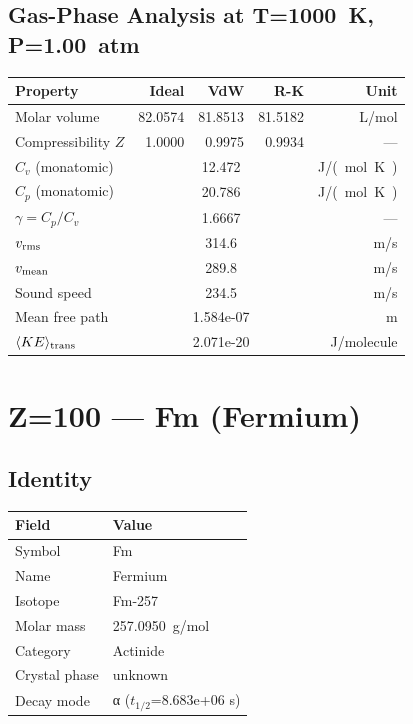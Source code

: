 \documentclass[11pt,a4paper]{article}
\begin{document}
\subsection{Gas-Phase Analysis at T=\SI{1000}{K}, P=\SI{1.00}{atm}}
\begin{tabular}{lrrrr}
  \toprule
  Property & Ideal & VdW & R-K & Unit \\
  \midrule
  Molar volume & 82.0574 & 81.8513 & 81.5182 & \si{L/mol} \\
  Compressibility $Z$ & 1.0000 & 0.9975 & 0.9934 & --- \\
  \midrule
  $C_v$ (monatomic) & \multicolumn{3}{c}{12.472} & \si{J/(mol.K)} \\
  $C_p$ (monatomic) & \multicolumn{3}{c}{20.786} & \si{J/(mol.K)} \\
  $\gamma = C_p/C_v$ & \multicolumn{3}{c}{1.6667} & --- \\
  $v_{\rm rms}$ & \multicolumn{3}{c}{314.6} & \si{m/s} \\
  $v_{\rm mean}$ & \multicolumn{3}{c}{289.8} & \si{m/s} \\
  Sound speed & \multicolumn{3}{c}{234.5} & \si{m/s} \\
  Mean free path & \multicolumn{3}{c}{1.584e-07} & \si{m} \\
  $\langle KE \rangle_{\rm trans}$ & \multicolumn{3}{c}{2.071e-20} & \si{J/molecule} \\
  \bottomrule
\end{tabular}

\newpage

\section{Z=100 --- Fm (Fermium)}
\label{sec:Z100}

\subsection{Identity}
\begin{tabular}{ll}
  \toprule
  Field & Value \\
  \midrule
  Symbol & Fm \\
  Name & Fermium \\
  Isotope & Fm-257 \\
  Molar mass & \SI{257.0950}{g/mol} \\
  Category & Actinide \\
  Crystal phase & unknown \\
  Decay mode & α ($t_{1/2}$=8.683e+06 s) \\
  \bottomrule
\end{tabular}
\end{document}
